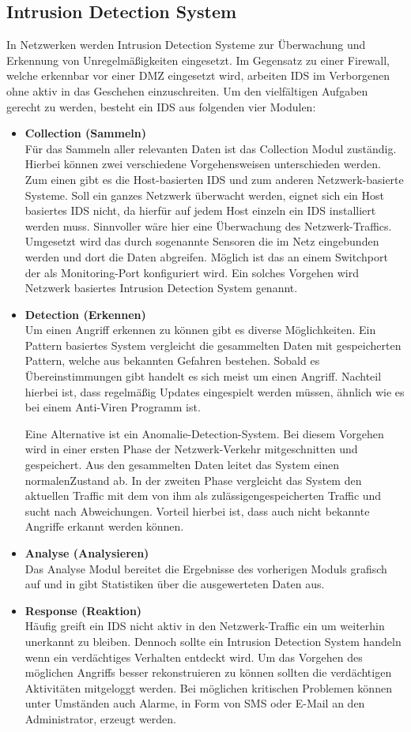 \subsection{Intrusion Detection System}
In Netzwerken werden Intrusion Detection Systeme zur Überwachung und Erkennung von Unregelmäßigkeiten eingesetzt. Im Gegensatz zu einer Firewall, welche erkennbar vor einer DMZ eingesetzt wird, arbeiten IDS im Verborgenen ohne aktiv in das Geschehen einzuschreiten. 
Um den vielfältigen Aufgaben gerecht zu werden, besteht ein IDS aus folgenden vier Modulen:
\begin{itemize}							%
\item{\textbf{Collection (Sammeln)}} 
\\Für das Sammeln aller relevanten Daten ist das Collection Modul zuständig. Hierbei können 
zwei verschiedene Vorgehensweisen unterschieden werden. Zum einen gibt es die Host-basierten IDS und zum anderen Netzwerk-basierte Systeme. Soll ein ganzes Netzwerk überwacht werden, eignet sich ein Host basiertes IDS nicht, da hierfür auf jedem Host einzeln ein IDS installiert werden muss. Sinnvoller wäre hier eine Überwachung des Netzwerk-Traffics. Umgesetzt wird das durch sogenannte Sensoren die im Netz eingebunden werden und dort die Daten abgreifen. Möglich ist das an einem Switchport der als Monitoring-Port konfiguriert wird. Ein solches Vorgehen wird Netzwerk basiertes Intrusion Detection System genannt. 
\item{\textbf{Detection (Erkennen)}} 
\\Um einen Angriff erkennen zu können gibt es diverse Möglichkeiten. Ein Pattern basiertes System vergleicht die gesammelten Daten mit gespeicherten Pattern, welche aus bekannten Gefahren bestehen. Sobald es Übereinstimmungen gibt handelt es sich meist um einen Angriff. Nachteil hierbei ist, dass regelmäßig Updates eingespielt werden müssen, ähnlich wie es bei einem Anti-Viren Programm ist.

Eine Alternative ist ein Anomalie-Detection-System. Bei diesem Vorgehen wird in einer ersten Phase der Netzwerk-Verkehr mitgeschnitten und gespeichert. Aus den gesammelten Daten leitet das System einen \glqq normalen\grqq Zustand ab. In der zweiten Phase vergleicht das System den aktuellen Traffic mit dem von ihm als \glqq zulässigen\grqq gespeicherten Traffic und sucht nach Abweichungen. Vorteil hierbei ist, dass auch nicht bekannte Angriffe erkannt werden können.
\item{\textbf{Analyse (Analysieren)}} 
\\Das Analyse Modul bereitet die Ergebnisse des vorherigen Moduls grafisch auf und in gibt Statistiken über die ausgewerteten Daten aus. 
\item{\textbf{Response (Reaktion)}} 
\\Häufig greift ein IDS nicht aktiv in den Netzwerk-Traffic ein um weiterhin unerkannt zu bleiben. Dennoch sollte ein Intrusion Detection System handeln wenn ein verdächtiges Verhalten entdeckt wird. Um das Vorgehen des möglichen Angriffs besser rekonstruieren zu können sollten die verdächtigen Aktivitäten mitgeloggt werden. Bei möglichen kritischen Problemen können unter Umständen auch Alarme, in Form von SMS oder E-Mail an den Administrator, erzeugt werden.
\end{itemize}
